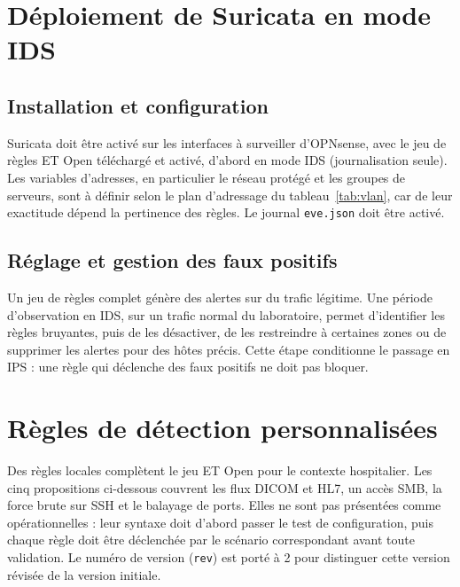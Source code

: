 \section{Déploiement de Suricata en mode IDS}

\subsection{Installation et configuration}

Suricata doit être activé sur les interfaces à surveiller d'OPNsense, avec le jeu de règles ET Open téléchargé et activé, d'abord en mode IDS (journalisation seule)\cite{opnsensedoc,suricatadoc}. Les variables d'adresses, en particulier le réseau protégé et les groupes de serveurs, sont à définir selon le plan d'adressage du tableau~\ref{tab:vlan}, car de leur exactitude dépend la pertinence des règles. Le journal \texttt{eve.json} doit être activé.


\subsection{Réglage et gestion des faux positifs}

Un jeu de règles complet génère des alertes sur du trafic légitime. Une période d'observation en IDS, sur un trafic normal du laboratoire, permet d'identifier les règles bruyantes, puis de les désactiver, de les restreindre à certaines zones ou de supprimer les alertes pour des hôtes précis. Cette étape conditionne le passage en IPS : une règle qui déclenche des faux positifs ne doit pas bloquer.


\section{Règles de détection personnalisées}
Des règles locales complètent le jeu ET Open pour le contexte hospitalier. Les cinq propositions ci-dessous couvrent les flux DICOM et HL7, un accès SMB, la force brute sur SSH et le balayage de ports. Elles ne sont pas présentées comme opérationnelles : leur syntaxe doit d'abord passer le test de configuration, puis chaque règle doit être déclenchée par le scénario correspondant avant toute validation. Le numéro de version (\texttt{rev}) est porté à 2 pour distinguer cette version révisée de la version initiale.

